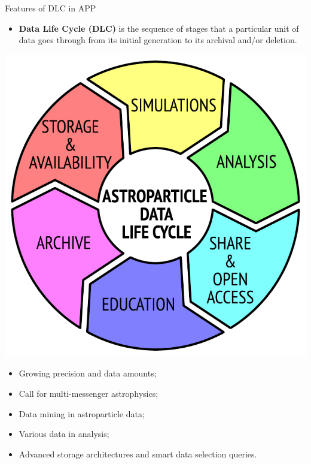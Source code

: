 \begin{frame}{Features of DLC in APP}
    \begin{itemize}
        \item \textbf{Data Life Cycle (DLC)} is the sequence of stages that a particular unit of data goes through from its initial generation 
        to its archival and/or deletion. 
    \end{itemize}

    \begin{minipage}[c]{0.35\textwidth}
        \includegraphics[width=1\textwidth]{pics/ADLC.pdf}
    \end{minipage}
    \hfill
    \begin{minipage}[c]{0.64\textwidth}
        \begin{itemize}
            \item Growing precision and data amounts;
            \item Call for multi-messenger astrophysics;
            \item Data mining in astroparticle data;
            \item Various data in analysis;
            \item Advanced storage architectures and smart data selection queries.
        \end{itemize}
    \end{minipage}
\end{frame}


